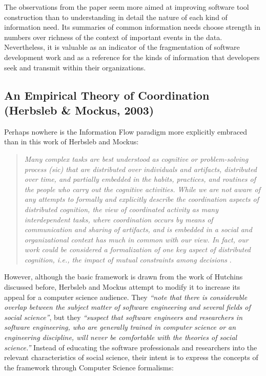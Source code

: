 The observations from the paper seem more aimed at improving software tool construction than to understanding in detail the nature of each kind of information need. Its summaries of common information needs choose strength in numbers over richness of the context of important events in the data. Nevertheless, it is valuable as an indicator of the fragmentation of software development work and as a reference for the kinds of information that developers seek and transmit within their organizations.

\subsection{An Empirical Theory of Coordination (Herbsleb \& Mockus, 2003)}

Perhaps nowhere is the Information Flow paradigm more explicitly embraced than in this work of Herbsleb and Mockus:

\begin{quote}
\emph{Many complex tasks are best understood as cognitive or problem-solving process \emph{(sic)} that are distributed over individuals and artifacts, distributed over time, and partially embedded in the habits, practices, and routines of the people who carry out the cognitive activities. While we are not aware of any attempts to formally and explicitly describe the coordination aspects of distributed cognition, the view of coordinated activity as many interdependent tasks, where coordination occurs by means of communication and sharing of artifacts, and is embedded in a social and organizational context has much in common with our view. In fact, our work could be considered a formalization of one key aspect of distributed cognition, i.e., the impact of mutual constraints among decisions} \cite{Herbsleb2003}.
\end{quote}

However, although the basic framework is drawn from the work of Hutchins discussed before, Herbsleb and Mockus attempt to modify it to increase its appeal for a computer science audience. They \emph{``note that there is considerable overlap between the subject matter of software engineering and several fields of social science''}, but they \emph{``suspect that software engineers and researchers in software engineering, who are generally trained in computer science or an engineering discipline, will never be comfortable with the theories of social science.''} Instead of educating the software professionals and researchers into the relevant characteristics of social science, their intent is to express the concepts of the framework through Computer Science formalisms:


